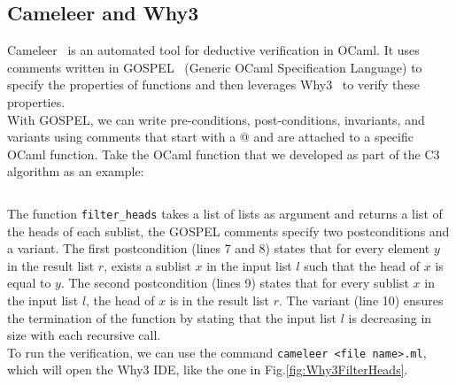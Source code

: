 \documentclass[runningheads]{llncs}
\begin{document}
\subsection{Cameleer and Why3}
Cameleer~\autocite{pereiraCameleerDeductiveVerification2021} is an automated tool for deductive verification in OCaml. It uses comments written in GOSPEL~\autocite{chargueraudGOSPELProvidingOCaml2019} (Generic OCaml Specification Language) to specify the properties of functions and then leverages Why3~\autocite{filliatreWhy3WherePrograms2013a} to verify these properties.\\
With GOSPEL, we can write pre-conditions, post-conditions, invariants, and variants using comments that start with a @ and are attached to a specific OCaml function. Take the OCaml function that we developed as part of the C3 algorithm as an example:
\inputminted[fontsize=\small,linenos,xleftmargin=20pt]{ocaml}{../filter_heads/filter_heads.ml}
The function \texttt{filter\_heads} takes a list of lists as argument and returns a list of the heads of each sublist, the GOSPEL comments specify two postconditions and a variant.
The first postcondition (lines 7 and 8) states that for every element \( y \) in the result list \( r \), exists a sublist \( x \) in the input list \( l \) such that the head of \( x \) is equal to \( y \).
The second postcondition (lines 9) states that for every sublist \( x \) in the input list \( l \), the head of \( x \) is in the result list \( r \).
The variant (line 10) ensures the termination of the function by stating that the input list \( l \) is decreasing in size with each recursive call.\\
To run the verification, we can use the command \texttt{cameleer <file name>.ml}, which will open the Why3 IDE, like the one in Fig.\ref{fig:Why3FilterHeads}.
\end{document}
